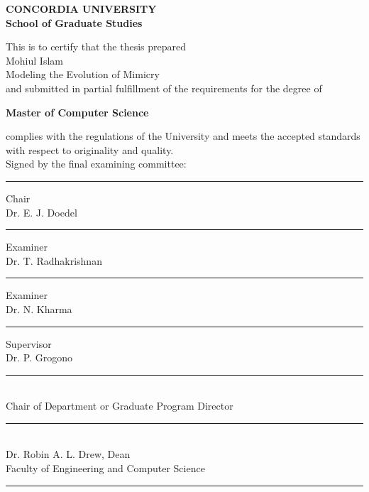 \begin{titlepage}
\begin{center}
\Large \textbf{CONCORDIA UNIVERSITY}\\
\Large \textbf{School of Graduate Studies}\\[1cm]
\end{center}
This is to certify that the thesis prepared\\
 Mohiul Islam\\
  Modeling the Evolution of Mimicry\\
and submitted in partial fulfillment of the requirements for the degree of
\begin{center}
\small \textbf{Master of Computer Science}\\
\end{center}
complies with the regulations of the University and meets the accepted standards with respect to originality and quality.\\[0.4cm]
Signed by the final examining committee:\\[0.5cm]
\makebox[5cm][l]{} \rule{7cm}{0.1mm} Chair\\ 
\makebox[5cm][l]{} Dr. E. J. Doedel\\[0.5cm]
\makebox[5cm][l]{} \rule{7cm}{0.1mm} Examiner\\ 
\makebox[5cm][l]{} Dr. T. Radhakrishnan\\[0.5cm]
\makebox[5cm][l]{} \rule{7cm}{0.1mm} Examiner\\ 
\makebox[5cm][l]{} Dr. N. Kharma\\[0.5cm]
\makebox[5cm][l]{} \rule{7cm}{0.1mm} Supervisor\\ 
\makebox[5cm][l]{} Dr. P. Grogono\\[0.5cm]
 \rule{10cm}{0.1mm}\\ 
\makebox[5cm][l]{} Chair of Department or Graduate Program Director\\[0.5cm]
\makebox[5cm][l]{} \rule{10cm}{0.1mm}\\ 
\makebox[5cm][l]{} Dr. Robin A. L. Drew, Dean \\
\makebox[5cm][l]{} Faculty of Engineering and Computer Science\\[0.5cm]
 \rule{7cm}{0.1mm}

\end{titlepage}